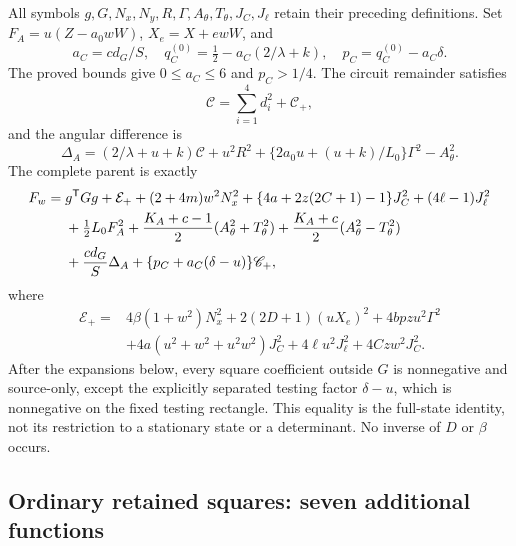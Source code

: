 \documentclass[11pt]{article}
\begin{document}
All symbols $g,G,N_x,N_y,R,\Gamma,A_\theta,T_\theta,J_C,J_\ell$
retain their preceding definitions.
Set $F_A=u(Z-a_0wW)$, $X_e=X+ewW$, and
\[
 a_C=cd_G/S,\quad q_C^{(0)}=\tfrac12-a_C(2/\lambda+k),\quad
 p_C=q_C^{(0)}-a_C\delta.
\]
The proved bounds give $0\le a_C\le6$ and $p_C>1/4$.
The circuit remainder satisfies
\[
 \mathscr C=\sum_{i=1}^4d_i^2+\mathscr C_+,
\]
and the angular difference is
\[
 \Delta_A=(2/\lambda+u+k)\mathscr C+u^2R^2
       +\{2a_0u+(u+k)/L_0\}\Gamma^2-A_\theta^2.
\]
The complete parent is exactly
\begin{align*}
 F_w={}&g^{\mathsf T}Gg+\mathcal E_+
 +(2+4m)w^2N_x^2
 +\{4a+2z(2C+1)-1\}J_C^2+(4\ell-1)J_\ell^2\\
 &+\tfrac12L_0F_A^2
 +{K_A+c-1\over2}(A_\theta^2+T_\theta^2)
 +{K_A+c\over2}(A_\theta^2-T_\theta^2)\\
 &+{cd_G\over S}\Delta_A
 +\{p_C+a_C(\delta-u)\}\mathscr C_+,
\end{align*}
where
\[
\begin{split}
 \mathcal E_+={}&4\beta(1+w^2)N_x^2+2(2D+1)(uX_e)^2
                 +4bpzu^2\Gamma^2\\
 &+4a(u^2+w^2+u^2w^2)J_C^2+4\ell u^2J_\ell^2
                                             +4Czw^2J_C^2.
\end{split}
\]
After the expansions below, every square coefficient outside $G$
is nonnegative and source-only, except the explicitly separated
testing factor $\delta-u$, which is nonnegative on the fixed
testing rectangle. This equality
is the full-state identity, not its restriction to a stationary
state or a determinant. No inverse of $D$ or $\beta$ occurs.

\subsection{Ordinary retained squares: seven additional functions}
\end{document}

